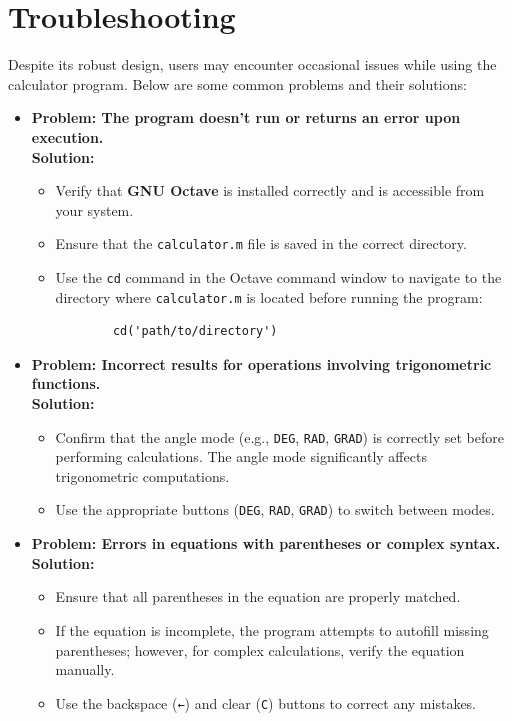 \documentclass[a4paper,12pt]{article}
\begin{document}
\newpage
\section{Troubleshooting}

Despite its robust design, users may encounter occasional issues while using the calculator program. Below are some common problems and their solutions:

\begin{itemize}
    \item \textbf{Problem: The program doesn't run or returns an error upon execution.} \\ 
    \textbf{Solution:}
    \begin{itemize}
        \item Verify that \textbf{GNU Octave} is installed correctly and is accessible from your system.
        \item Ensure that the \texttt{calculator.m} file is saved in the correct directory.
        \item Use the \texttt{cd} command in the Octave command window to navigate to the directory where \texttt{calculator.m} is located before running the program:
        \begin{verbatim}
        cd('path/to/directory')
        \end{verbatim}
    \end{itemize}

    \item \textbf{Problem: Incorrect results for operations involving trigonometric functions.} \\ 
    \textbf{Solution:}
    \begin{itemize}
        \item Confirm that the angle mode (e.g., \texttt{DEG}, \texttt{RAD}, \texttt{GRAD}) is correctly set before performing calculations. The angle mode significantly affects trigonometric computations.
        \item Use the appropriate buttons (\texttt{DEG}, \texttt{RAD}, \texttt{GRAD}) to switch between modes.

    \end{itemize}

    \item \textbf{Problem: Errors in equations with parentheses or complex syntax.} \\ 
    \textbf{Solution:}
    \begin{itemize}
        \item Ensure that all parentheses in the equation are properly matched.
        \item If the equation is incomplete, the program attempts to autofill missing parentheses; however, for complex calculations, verify the equation manually.
        \item Use the backspace (\texttt{←}) and clear (\texttt{C}) buttons to correct any mistakes.
    \end{itemize}


\end{itemize}
\end{document}
